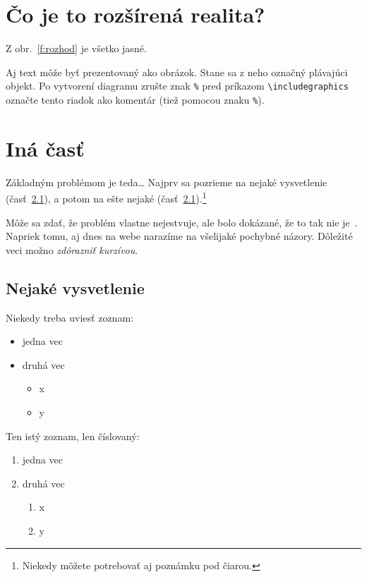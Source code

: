 \documentclass[10pt,twoside,slovak,a4paper]{article}
\begin{document}
\section{Čo je to rozšírená realita?} \label{rozsirenaRealita}
Z obr.~\ref{f:rozhod} je všetko jasné. 

\begin{figure*}[tbh]
\centering
Aj text môže byť prezentovaný ako obrázok. Stane sa z neho označný plávajúci objekt. Po vytvorení diagramu zrušte znak \texttt{\%} pred príkazom \verb|\includegraphics| označte tento riadok ako komentár (tiež pomocou znaku \texttt{\%}).
\caption{Rozhodujúci argument.}
\label{f:rozhod}
\end{figure*}



\section{Iná časť} \label{ina}

Základným problémom je teda\ldots{} Najprv sa pozrieme na nejaké vysvetlenie (časť~\ref{ina:nejake}), a potom na ešte nejaké (časť~\ref{ina:nejake}).\footnote{Niekedy môžete potrebovať aj poznámku pod čiarou.}

Môže sa zdať, že problém vlastne nejestvuje\cite{Coplien:MPD}, ale bolo dokázané, že to tak nie je~\cite{Czarnecki:Staged, Czarnecki:Progress}. Napriek tomu, aj dnes na webe narazíme na všelijaké pochybné názory\cite{PLP-Framework}. Dôležité veci možno \emph{zdôrazniť kurzívou}.


\subsection{Nejaké vysvetlenie} \label{ina:nejake}

Niekedy treba uviesť zoznam:

\begin{itemize}
\item jedna vec
\item druhá vec
	\begin{itemize}
	\item x
	\item y
	\end{itemize}
\end{itemize}

Ten istý zoznam, len číslovaný:

\begin{enumerate}
\item jedna vec
\item druhá vec
	\begin{enumerate}
	\item x
	\item y
	\end{enumerate}
\end{enumerate}
\end{document}

